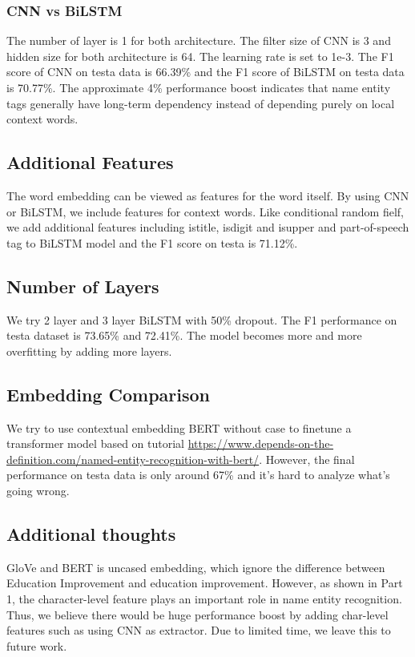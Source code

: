 \documentclass[a4paper]{article}
\begin{document}
\begin{spacing}{1.5}
  \subsubsection{CNN vs BiLSTM}
  The number of layer is 1 for both architecture. The filter size of CNN is 3 and hidden size for both architecture is 64. The learning rate is set to 1e-3. The F1 score of CNN on testa data is 66.39\% and the F1 score of BiLSTM on testa data is 70.77\%. The approximate 4\% performance boost indicates that name entity tags generally have long-term dependency instead of depending purely on local context words.
  
  \subsection{Additional Features}
  The word embedding can be viewed as features for the word itself. By using CNN or BiLSTM, we include features for context words. Like conditional random fielf, we add additional features including istitle, isdigit and isupper and part-of-speech tag to BiLSTM model and the F1 score on testa is 71.12\%.
  
  \subsection{Number of Layers}
  We try 2 layer and 3 layer BiLSTM with 50\% dropout. The F1 performance on testa dataset is 73.65\% and 72.41\%. The model becomes more and more overfitting by adding more layers.
  
  \subsection{Embedding Comparison}
  We try to use contextual embedding BERT \cite{bert} without case to finetune a transformer model based on tutorial \url{https://www.depends-on-the-definition.com/named-entity-recognition-with-bert/}. However, the final performance on testa data is only around 67\% and it's hard to analyze what's going wrong.
  
  \subsection{Additional thoughts}
  GloVe and BERT is uncased embedding, which ignore the difference between Education Improvement and education improvement. However, as shown in Part 1, the character-level feature plays an important role in name entity recognition. Thus, we believe there would be huge performance boost by adding char-level features such as using CNN as extractor. Due to limited time, we leave this to future work.
  
  \end{spacing}  
  
  
\end{document}
